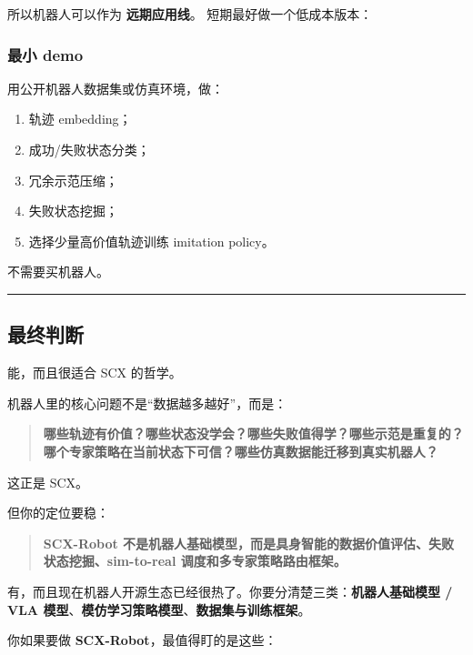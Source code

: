 \documentclass[
  12pt,
]{ctexart}
\providecommand{\tightlist}{%
  \setlength{\itemsep}{0pt}\setlength{\parskip}{0pt}}
\begin{document}
所以机器人可以作为 \textbf{远期应用线}。 短期最好做一个低成本版本：

\subsubsection{最小 demo}\label{ux6700ux5c0f-demo}

用公开机器人数据集或仿真环境，做：

\begin{enumerate}
\def\labelenumi{\arabic{enumi}.}
\tightlist
\item
  轨迹 embedding；
\item
  成功/失败状态分类；
\item
  冗余示范压缩；
\item
  失败状态挖掘；
\item
  选择少量高价值轨迹训练 imitation policy。
\end{enumerate}

不需要买机器人。

\begin{center}\rule{0.5\linewidth}{0.5pt}\end{center}

\subsection{最终判断}\label{ux6700ux7ec8ux5224ux65ad}

能，而且很适合 SCX 的哲学。

机器人里的核心问题不是``数据越多越好''，而是：

\begin{quote}
\textbf{哪些轨迹有价值？哪些状态没学会？哪些失败值得学？哪些示范是重复的？哪个专家策略在当前状态下可信？哪些仿真数据能迁移到真实机器人？}
\end{quote}

这正是 SCX。

但你的定位要稳：

\begin{quote}
\textbf{SCX-Robot
不是机器人基础模型，而是具身智能的数据价值评估、失败状态挖掘、sim-to-real
调度和多专家策略路由框架。}
\end{quote}

有，而且现在机器人开源生态已经很热了。你要分清楚三类：\textbf{机器人基础模型
/ VLA 模型}、\textbf{模仿学习策略模型}、\textbf{数据集与训练框架}。

你如果要做 \textbf{SCX-Robot}，最值得盯的是这些：
\end{document}
